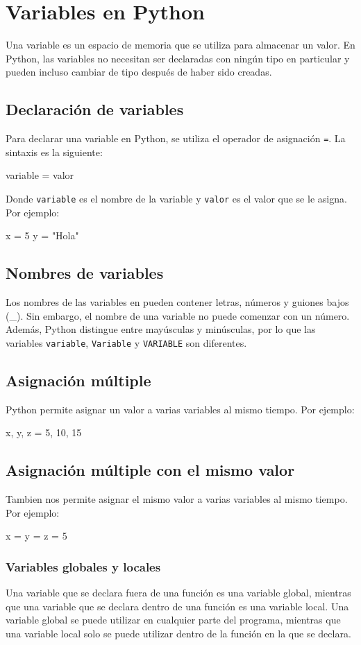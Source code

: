 \documentclass{article}
\begin{document}
\tableofcontents

\newpage

\section{Variables en Python}
Una variable es un espacio de memoria que se utiliza para almacenar un valor. En Python, las variables no necesitan ser declaradas con ningún tipo en particular y pueden incluso cambiar de tipo después de haber sido creadas.
\subsection{Declaración de variables}
Para declarar una variable en Python, se utiliza el operador de asignación \texttt{=}. La sintaxis es la siguiente:
\begin{python_code}
variable = valor
\end{python_code}
Donde \texttt{variable} es el nombre de la variable y \texttt{valor} es el valor que se le asigna. Por ejemplo:
\begin{python_code}
x = 5
y = "Hola"
\end{python_code}
\subsection{Nombres de variables}
Los nombres de las variables en pueden contener letras, números y guiones bajos (\_). Sin embargo, el nombre de una variable no puede comenzar con un número. Además, Python distingue entre mayúsculas y minúsculas, por lo que las variables \texttt{variable}, \texttt{Variable} y \texttt{VARIABLE} son diferentes.
\subsection{Asignación múltiple}
Python permite asignar un valor a varias variables al mismo tiempo. Por ejemplo:
\begin{python_code}
x, y, z = 5, 10, 15
\end{python_code}
\subsection{Asignación múltiple con el mismo valor}
Tambien nos permite asignar el mismo valor a varias variables al mismo tiempo. Por ejemplo:
\begin{python_code}
x = y = z = 5
\end{python_code}
\subsubsection{Variables globales y locales}
Una variable que se declara fuera de una función es una variable global, mientras que una variable que se declara dentro de una función es una variable local. Una variable global se puede utilizar en cualquier parte del programa, mientras que una variable local solo se puede utilizar dentro de la función en la que se declara.
\end{document}
